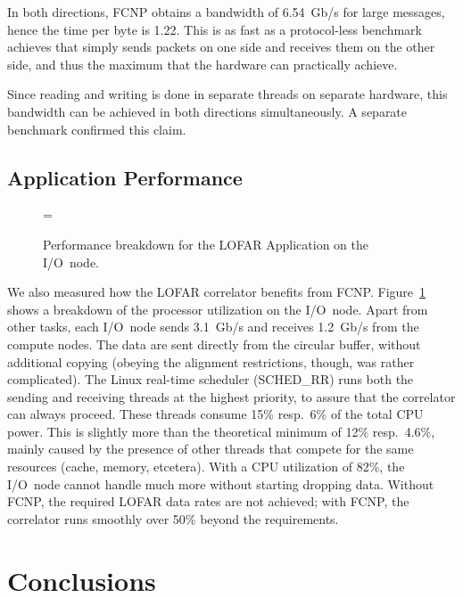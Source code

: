 \documentclass[journal]{IEEEtran}
\begin{document}
In both directions, FCNP obtains a bandwidth of 6.54~Gb/s for large messages,
hence the time per byte is 1.22\ns.
This is as fast as a protocol-less benchmark achieves that simply sends packets
on one side and receives them on the other side, and thus the maximum that
the hardware can practically achieve.

Since reading and writing is done in separate threads on separate hardware,
this bandwidth can be achieved in both directions simultaneously.
A separate benchmark confirmed this claim.




\subsection{Application Performance}

\begin{figure}[h]
\epsfxsize=\columnwidth
{}
\caption{Performance breakdown for the LOFAR Application on the I/O~node.}
\label{fig:ionode-load}
\end{figure}

We also measured how the LOFAR correlator benefits from FCNP.
Figure~\ref{fig:ionode-load} shows a breakdown of the processor
utilization on the I/O~node.
Apart from other tasks, each I/O~node sends 3.1~Gb/s and receives 1.2~Gb/s
from the compute nodes.
The data are sent directly from the circular buffer, without additional
copying (obeying the alignment restrictions, though, was rather complicated).
The Linux real-time scheduler (SCHED\_RR) runs both the sending and receiving
threads at the highest priority, to assure that the correlator can always
proceed.
These threads consume 15\% resp.\ 6\% of the total CPU power.
This is slightly more than the theoretical minimum of 12\% resp.\ 4.6\%,
mainly caused by the presence of other threads that compete for the same
resources (cache, memory, etcetera).
With a CPU utilization of 82\%, the I/O~node cannot handle much more without
starting dropping data.
Without FCNP, the required LOFAR data rates are not achieved;
with FCNP, the correlator runs smoothly over 50\% beyond the requirements.


\section{Conclusions}
\label{sec:conclusions}
\end{document}
